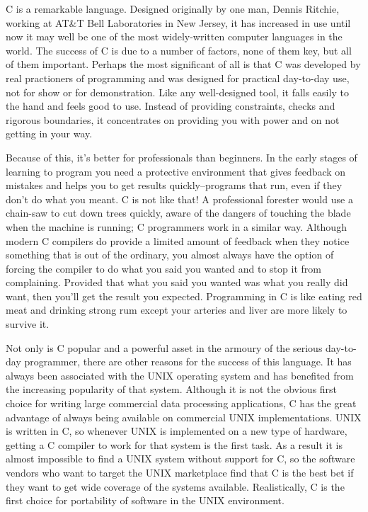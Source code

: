
  

  C is a remarkable language. Designed originally by one man, Dennis
   Ritchie, working at AT\&T Bell Laboratories in New Jersey, it has
   increased in use until now it may well be one of the most widely-written
   computer languages in the world. The success of C is due to a number of
   factors, none of them key, but all of them important. Perhaps the most
   significant of all is that C was developed by real practioners of
   programming and was designed for practical day-to-day use, not for show or
   for demonstration. Like any well-designed tool, it falls easily to the hand
   and feels good to use. Instead of providing constraints, checks and
   rigorous boundaries, it concentrates on providing you with power and on not
   getting in your way.


  Because of this, it's better for professionals than beginners. In the
   early stages of learning to program you need a protective environment that
   gives feedback on mistakes and helps you to get results
   quickly--programs that run, even if they don't do what you meant.
   C is not like that! A professional forester would use a chain-saw to
   cut down trees quickly, aware of the dangers of touching the blade when the
   machine is running; C programmers work in a similar way. Although
   modern C compilers do provide a limited amount of feedback when they notice
   something that is out of the ordinary, you almost always have the option of
   forcing the compiler to do what you said you wanted and to stop it from
   complaining. Provided that what you said you wanted was what you really did
   want, then you'll get the result you expected. Programming in C is like
   eating red meat and drinking strong rum except your arteries and liver are
   more likely to survive it.


  Not only is C popular and a powerful asset in the armoury of the serious
   day-to-day programmer, there are other reasons for the success of this
   language. It has always been associated with the UNIX operating system and
   has benefited from the increasing popularity of that system. Although it is
   not the obvious first choice for writing large commercial data processing
   applications, C has the great advantage of always being available on
   commercial UNIX implementations. UNIX is written in C, so whenever
   UNIX is implemented on a new type of hardware, getting a C compiler to work
   for that system is the first task. As a result it is almost impossible to
   find a UNIX system without support for C, so the software vendors who
   want to target the UNIX marketplace find that C is the best bet if they
   want to get wide coverage of the systems available. Realistically,
   C is the first choice for portability of software in the UNIX
   environment.


